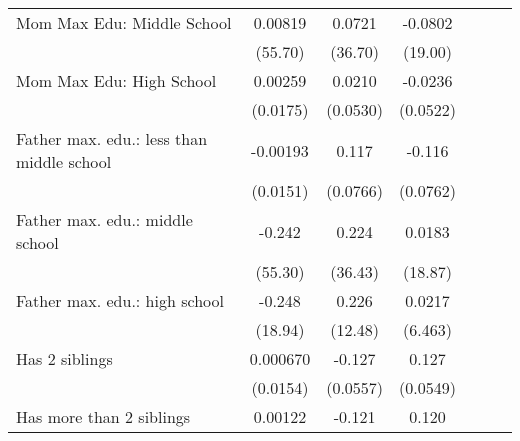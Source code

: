 {\begin{tabular}{l*{6}{c}}
\addlinespace
Mom Max Edu: Middle School&     0.00819         &      0.0721         &     -0.0802         &                     &                     &                     \\
                    &     (55.70)         &     (36.70)         &     (19.00)         &                     &                     &                     \\
\addlinespace
Mom Max Edu: High School&     0.00259         &      0.0210         &     -0.0236         &                     &                     &                     \\
                    &    (0.0175)         &    (0.0530)         &    (0.0522)         &                     &                     &                     \\
\addlinespace
Father max. edu.: less than middle school&    -0.00193         &       0.117         &      -0.116         &                     &                     &                     \\
                    &    (0.0151)         &    (0.0766)         &    (0.0762)         &                     &                     &                     \\
\addlinespace
Father max. edu.: middle school&      -0.242         &       0.224         &      0.0183         &                     &                     &                     \\
                    &     (55.30)         &     (36.43)         &     (18.87)         &                     &                     &                     \\
\addlinespace
Father max. edu.: high school&      -0.248         &       0.226         &      0.0217         &                     &                     &                     \\
                    &     (18.94)         &     (12.48)         &     (6.463)         &                     &                     &                     \\
\addlinespace
Has 2 siblings      &    0.000670         &      -0.127\sym{*}  &       0.127\sym{*}  &                     &                     &                     \\
                    &    (0.0154)         &    (0.0557)         &    (0.0549)         &                     &                     &                     \\
\addlinespace
Has more than 2 siblings&     0.00122         &      -0.121         &       0.120         &                     &                     &                     \\

\end{tabular}}
